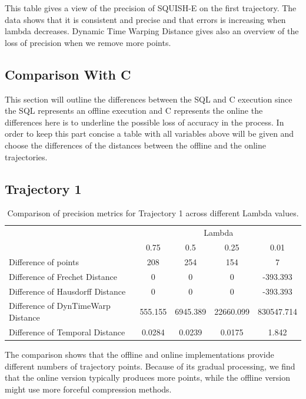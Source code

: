 This table gives a view of the precision of SQUISH-E on the first trajectory. The data shows that it is consistent and precise and that errors is increasing when lambda decreases. Dynamic Time Warping Distance gives also an overview of the loss of precision when we remove more points.

\subsection{Comparison With C}
This section will outline the differences between the SQL and C execution since the SQL represents an offline execution and C represents the online the differences here is to underline the possible loss of accuracy in the process. In order to keep this part concise a table with all variables above will be given and choose the differences of the distances between the offline and the online trajectories.

\subsection{Trajectory 1}

\begin{table}[htbp]
    \centering
    \label{tab:precision_metrics_c}
    \begin{tabular}{@{}lcccc@{}}
        \toprule
        & \multicolumn{4}{c}{Lambda} \\
        \cmidrule{2-5}
        & 0.75       & 0.5        & 0.25       & 0.01       \\
        \midrule
        Difference of points           & 208 & 254 & 154 & 7 \\
        Difference of Frechet Distance              & 0 & 0 & 0 & -393.393 \\
        Difference of Hausdorff Distance             & 0 & 0 & 0 & -393.393 \\
        Difference of DynTimeWarp Distance            & 555.155 & 6945.389 & 22660.099 & 830547.714\\
        Difference of Temporal Distance            & 0.0284 & 0.0239 & 0.0175 & 1.842\\
        \bottomrule
    \end{tabular}
    \caption{Comparison of precision metrics for Trajectory 1 across different Lambda values.}
\end{table}

The comparison shows that the offline and online implementations provide different numbers of trajectory points. Because of its gradual processing, we find that the online version typically produces more points, while the offline version might use more forceful compression methods.

